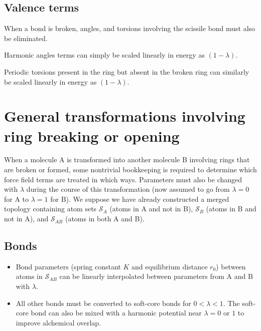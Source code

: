 \documentclass[aps,pre,twocolumn,superscriptaddress,nofootinbib]{revtex4-1}
\begin{document}
\subsection{Valence terms}

When a bond is broken, angles, and torsions involving the scissile bond must also be eliminated.

Harmonic angles terms can simply be scaled linearly in energy as $(1 - \lambda)$.

Periodic torsions present in the ring but absent in the broken ring can similarly be scaled linearly in energy as $(1 - \lambda)$.


\section{General transformations involving ring breaking or opening}

When a molecule A is transformed into another molecule B involving rings that are broken or formed, some nontrivial bookkeeping is required to determine which force field terms are treated in which ways.
Parameters must also be changed with $\lambda$ during the course of this transformation (now assumed to go from $\lambda = 0$ for A to $\lambda = 1$ for B).
We suppose we have already constructed a merged topology containing atom sets $\mathcal{S}_{A}$ (atoms in A and not in B), $\mathcal{S}_{B}$ (atoms in B and not in A), and $\mathcal{S}_{AB}$ (atoms in both A and B).

\subsection{Bonds}
\begin{itemize}
  \item Bond parameters (spring constant $K$ and equilibrium distance $r_0$) between atoms in $\mathcal{S}_{AB}$ can be linearly interpolated between parameters from A and B with $\lambda$.
  \item All other bonds must be converted to soft-core bonds for $0 < \lambda < 1$.  
  The soft-core bond can also be mixed with a harmonic potential near $\lambda = 0$ or $1$ to improve alchemical overlap.
\end{itemize}
\end{document}
